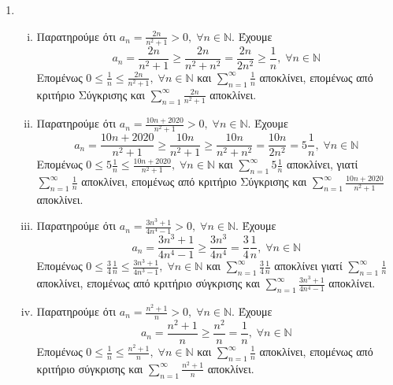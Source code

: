 \begin{enumerate}
  \item 
    \begin{enumerate}[i)]
      \item Παρατηρούμε ότι $ a_{n} = \frac{2n}{n^{2}+1} > 0, \; \forall n \in 
        \mathbb{N} $.  Έχουμε 
        \[
          a_{n} = \frac{2n}{n^{2}+1} \geq \frac{2n}{n^{2}+n^{2}} = 
          \frac{2n}{2n^{2}} \geq \frac{1}{n}, \; \forall n \in \mathbb{N} 
        \] 
        Επομένως $ 0 \leq \frac{1}{n} \leq \frac{2n}{n^{2}+1}, \; 
        \forall n \in \mathbb{N} $ και $ \sum_{n=1}^{\infty} \frac{1}{n} $ 
        αποκλίνει, επομένως από κριτήριο Σύγκρισης και $ \sum_{n=1}^{\infty} 
        \frac{2n}{n^{2}+1} $ αποκλίνει.

      \item Παρατηρούμε ότι $ a_{n} = \frac{10n+2020}{n^{2}+1} > 0, \; 
        \forall n \in \mathbb{N} $. Έχουμε
        \[
          a_{n} = \frac{10n+2020}{n^{2}+1} \geq \frac{10n}{n^{2}+1} \geq 
          \frac{10n}{n^{2}+n^{2}} = \frac{10n}{2n^{2}} = 5 \frac{1}{n}, \; 
          \forall n \in \mathbb{N}
        \] 
        Επομένως $ 0 \leq 5 \frac{1}{n} \leq \frac{10n+2020}{n^{2}+1}, \; 
        \forall n \in \mathbb{N} $ και $ \sum_{n=1}^{\infty} 5 \frac{1}{n} $ 
        αποκλίνει, γιατί $ \sum_{n=1}^{\infty} \frac{1}{n} $ αποκλίνει, 
        επομένως από κριτήριο Σύγκρισης και $ \sum_{n=1}^{\infty} 
        \frac{10n +2020}{n^{2}+1} $ αποκλίνει.

      \item Παρατηρούμε ότι $ a_{n} = \frac{3n^{3}+1}{4n^{4}-1} > 0, \; \forall n 
        \in \mathbb{N} $. Έχουμε
        \[
          a_{n} = \frac{3n^{3}+1}{4n^{4}-1} \geq \frac{3n^{3}}{4n^{4}} = 
          \frac{3}{4} \frac{1}{n}, \; \forall n \in \mathbb{N} 
        \] 
        Επομένως $ 0 \leq \frac{3}{4} \frac{1}{n} \leq \frac{3n^{3}+1}{4n^{3}-1}, 
        \; \forall n \in \mathbb{N} $ και $ \sum_{n=1}^{\infty} \frac{3}{4} 
        \frac{1}{n} $ αποκλίνει γιατί $ \sum_{n=1}^{\infty} \frac{1}{n} $ 
        αποκλίνει, επομένως από κριτήριο σύγκρισης και $ \sum_{n=1}^{\infty} 
        \frac{3n^{3}+1}{4n^{4}-1} $ αποκλίνει.

      \item Παρατηρούμε ότι $ a_{n} = \frac{n^{2}+1}{n} > 0, \; \forall n 
        \in \mathbb{N} $. Έχουμε 
        \[
          a_{n} = \frac{n^{2}+1}{n} \geq \frac{n^{2}}{n} = \frac{1}{n}, \; 
          \forall n \in \mathbb{N}  
        \]
        Επομένως $ 0 \leq \frac{1}{n} \leq \frac{n^{2}+1}{n}, \; \forall n \in
        \mathbb{N}  $ και $ \sum_{n=1}^{\infty} \frac{1}{n} $ αποκλίνει, επομένως 
        από κριτήριο σύγκρισης και $ \sum_{n=1}^{\infty} \frac{n^{2}+1}{n} $ 
        αποκλίνει.


\end{enumerate}
\end{enumerate}
